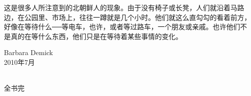 \begin{multicols}{\theparacolNo}
这是很多人所注意到的北朝鲜人的现象。由于没有椅子或长凳，人们就沿着马路边，在公园里、市场上，往往一蹲就是几个小时。他们就这么直勾勾的看着前方，好像在等待什么──等电车，也许，或者等过路车，一个朋友或亲戚。也许他们不是真的在等什么东西，他们只是在等待着某些事情的变化。\\

\begin{flushright}
	Barbara Demick\\

	2010年7月\\
\end{flushright}


\begin{center}
	\textcolor{PinYinColor}
		{{\FA } \\
		全书完\\}
\end{center}
\ifnum{}
	\end{multicols}
\fi